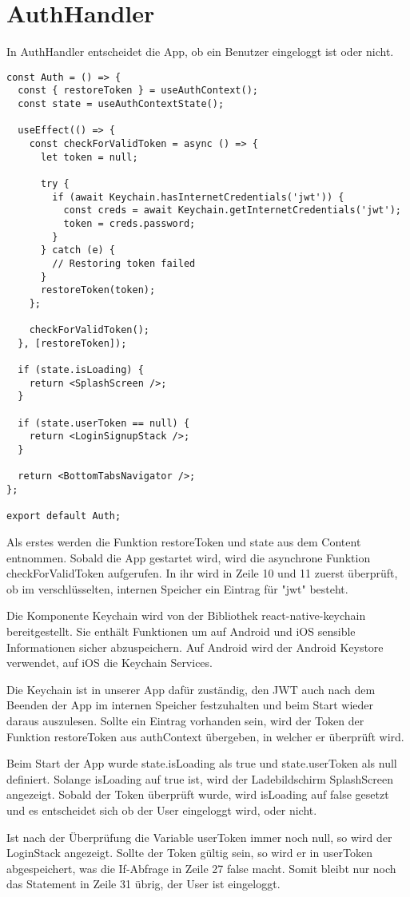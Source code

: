 \section{AuthHandler}
In AuthHandler entscheidet die App, ob ein Benutzer eingeloggt ist oder nicht.

\begin{lstlisting}
const Auth = () => {
  const { restoreToken } = useAuthContext();
  const state = useAuthContextState();

  useEffect(() => {
    const checkForValidToken = async () => {
      let token = null;

      try {
        if (await Keychain.hasInternetCredentials('jwt')) {
          const creds = await Keychain.getInternetCredentials('jwt');
          token = creds.password;
        }
      } catch (e) {
        // Restoring token failed
      }
      restoreToken(token);
    };

    checkForValidToken();
  }, [restoreToken]);

  if (state.isLoading) {
    return <SplashScreen />;
  }

  if (state.userToken == null) {
    return <LoginSignupStack />;
  }

  return <BottomTabsNavigator />;
};

export default Auth;
\end{lstlisting}

Als erstes werden die Funktion restoreToken und state aus dem Content entnommen. Sobald die App
gestartet wird, wird die asynchrone Funktion checkForValidToken aufgerufen. In ihr wird in Zeile 10
und 11 zuerst überprüft, ob im verschlüsselten, internen Speicher ein Eintrag für "jwt" besteht.

Die Komponente Keychain wird von der Bibliothek react-native-keychain bereitgestellt. Sie enthält
Funktionen um auf Android und iOS sensible Informationen sicher abzuspeichern. Auf Android wird der
Android Keystore verwendet, auf iOS die Keychain Services.

Die Keychain ist in unserer App dafür zuständig, den JWT auch nach dem Beenden der App im internen
Speicher festzuhalten und beim Start wieder daraus auszulesen. Sollte ein Eintrag vorhanden sein,
wird der Token der Funktion restoreToken aus authContext übergeben, in welcher er überprüft wird.

Beim Start der App wurde state.isLoading als true und state.userToken als null definiert. Solange
isLoading auf true ist, wird der Ladebildschirm SplashScreen angezeigt. Sobald der Token überprüft
wurde, wird isLoading auf false gesetzt und es entscheidet sich ob der User eingeloggt wird, oder
nicht.

Ist nach der Überprüfung die Variable userToken immer noch null, so wird der LoginStack angezeigt.
Sollte der Token gültig sein, so wird er in userToken abgespeichert, was die If-Abfrage in Zeile 27
false macht. Somit bleibt nur noch das Statement in Zeile 31 übrig, der User ist eingeloggt.
